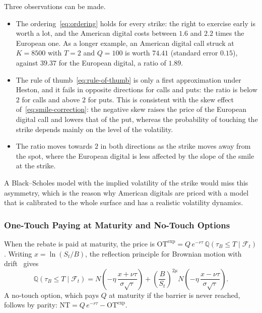 \documentclass[11pt,a4paper]{article}
\theoremstyle{remark}
\begin{document}
Three observations can be made.
\begin{itemize}
  \item The ordering~\eqref{eq:ordering} holds for every strike: the right to
        exercise early is worth a lot, and the American digital costs between
        $1.6$ and $2.2$ times the European one. As a longer example, an
        American digital call struck at $K = 8500$ with $T = 2$ and $Q = 100$
        is worth $74.41$ (standard error $0.15$), against $39.37$ for the
        European digital, a ratio of $1.89$.
  \item The rule of thumb~\eqref{eq:rule-of-thumb} is only a first
        approximation under Heston, and it fails in opposite directions for
        calls and puts: the ratio is below $2$ for calls and above $2$ for
        puts. This is consistent with the skew effect
        of~\eqref{eq:smile-correction}: the negative skew raises the price of
        the European digital call and lowers that of the put, whereas the
        probability of touching the strike depends mainly on the level of the
        volatility.
  \item The ratio moves towards $2$ in both directions as the strike moves
        away from the spot, where the European digital is less affected by the
        slope of the smile at the strike.
\end{itemize}
A Black--Scholes model with the implied volatility of the strike would miss
this asymmetry, which is the reason why American digitals are priced with a
model that is calibrated to the whole surface and has a realistic volatility
dynamics.


\subsubsection{One-Touch Paying at Maturity and No-Touch Options}

When the rebate is paid at maturity, the price is
$\mathrm{OT}^{\mathrm{exp}} = Q\,e^{-r\tau}\,\mathbb{Q}(\tau_B \leq T \mid \mathcal{F}_t)$.
Writing $x = \ln(S_t/B)$, the reflection principle for Brownian motion with
drift~\cite{Shreve2004} gives
\begin{equation}
  \mathbb{Q}(\tau_B \leq T \mid \mathcal{F}_t)
  = N\!\left(-\eta\,\frac{x + \nu\tau}{\sigma\sqrt{\tau}}\right)
  + \left(\frac{B}{S_t}\right)^{2\mu} N\!\left(-\eta\,\frac{x - \nu\tau}{\sigma\sqrt{\tau}}\right).
  \label{eq:touch-probability}
\end{equation}
A no-touch option, which pays $Q$ at maturity if the barrier is never reached,
follows by parity: $\mathrm{NT} = Q\,e^{-r\tau} - \mathrm{OT}^{\mathrm{exp}}$.
\end{document}
